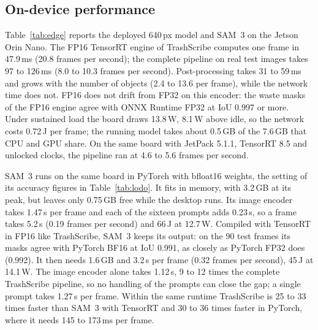 \documentclass[pdflatex,sn-basic,Numbered]{sn-jnl}%
\newcommand{\trashscribe}{TrashScribe}
\begin{document}
\subsection{On-device performance}\label{sec:edge}
Table~\ref{tab:edge} reports the deployed 640\,px model and SAM~3 on the Jetson Orin Nano. The FP16 TensorRT engine of \trashscribe{} computes one frame in 47.9\,ms (20.8 frames per second); the complete pipeline on real test images takes 97 to 126\,ms (8.0 to 10.3 frames per second). Post-processing takes 31 to 59\,ms and grows with the number of objects (2.4 to 13.6 per frame), while the network time does not. FP16 does not drift from FP32 on this encoder: the waste masks of the FP16 engine agree with ONNX Runtime FP32 at IoU 0.997 or more. Under sustained load the board draws 13.8\,W, 8.1\,W above idle, so the network costs 0.72\,J per frame; the running model takes about 0.5\,GB of the 7.6\,GB that CPU and GPU share. On the same board with JetPack 5.1.1, TensorRT 8.5 and unlocked clocks, the pipeline ran at 4.6 to 5.6 frames per second.

SAM~3 runs on the same board in PyTorch with bfloat16 weights, the setting of its accuracy figures in Table~\ref{tab:lodo}. It fits in memory, with 3.2\,GB at its peak, but leaves only 0.75\,GB free while the desktop runs. Its image encoder takes 1.47\,s per frame and each of the sixteen prompts adds 0.23\,s, so a frame takes 5.2\,s (0.19 frames per second) and 66\,J at 12.7\,W. Compiled with TensorRT in FP16 like \trashscribe{}, SAM~3 keeps its output: on the 90 test frames its masks agree with PyTorch BF16 at IoU 0.991, as closely as PyTorch FP32 does (0.992). It then needs 1.6\,GB and 3.2\,s per frame (0.32 frames per second), 45\,J at 14.1\,W. The image encoder alone takes 1.12\,s, 9 to 12 times the complete \trashscribe{} pipeline, so no handling of the prompts can close the gap; a single prompt takes 1.27\,s per frame. Within the same runtime \trashscribe{} is 25 to 33 times faster than SAM~3 with TensorRT and 30 to 36 times faster in PyTorch, where it needs 145 to 173\,ms per frame.
\end{document}
